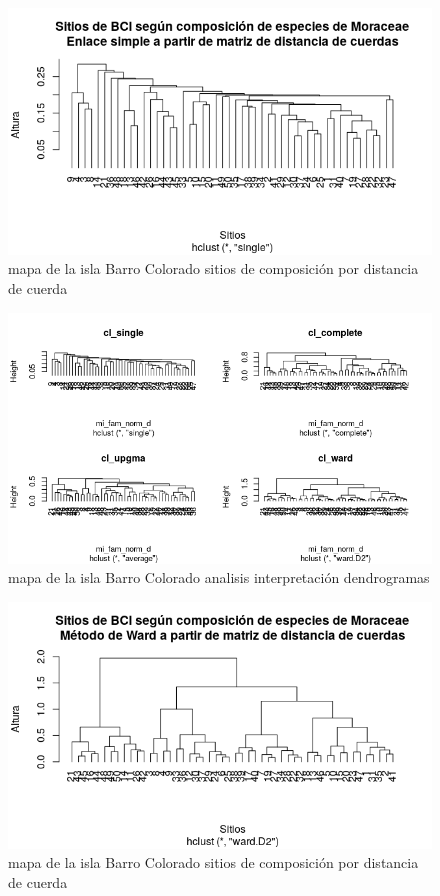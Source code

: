 \documentclass[11pt,]{article}
\begin{document}
\begin{figure}
\centering
\includegraphics[width=1.00000\textwidth]{sitios_composicion_distancia_cuerdas.png}
\caption{mapa de la isla Barro Colorado sitios de composición por
distancia de cuerda \label{fig:bci_map}}
\end{figure}

\begin{figure}
\centering
\includegraphics[width=1.00000\textwidth]{analisis_interpretacion_dendrogramas.png}
\caption{mapa de la isla Barro Colorado analisis interpretación
dendrogramas \label{fig:bci_map}}
\end{figure}

\begin{figure}
\centering
\includegraphics[width=1.00000\textwidth]{sitios_metodo_ward.png}
\caption{mapa de la isla Barro Colorado sitios de composición por
distancia de cuerda \label{fig:bci_map}}
\end{figure}
\end{document}
